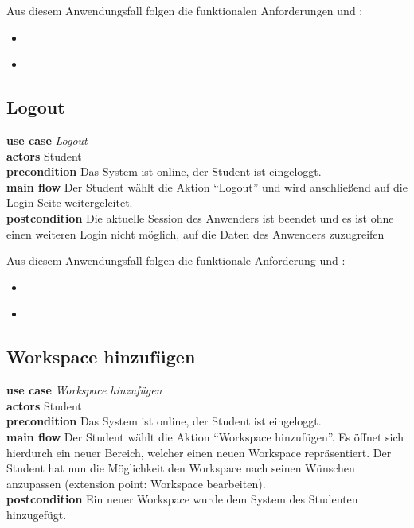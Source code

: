 Aus diesem Anwendungsfall folgen die funktionalen Anforderungen  und :
\begin{itemize}
 \item \requirement{\requirementLogin}\label{requirementLogin}
 \item \requirement{\requirementZugriffAufEigeneWidgets}\label{requirementZugriffAufEigeneWidgets}
\end{itemize}

\subsection{Logout}
\textbf{use case} \emph{Logout}\\
\textbf{actors} Student\\
\textbf{precondition} Das System ist online, der Student ist eingeloggt.\\
\textbf{main flow} Der Student wählt die Aktion "`Logout"' und wird anschließend auf die Login-Seite weitergeleitet.\\
\textbf{postcondition} Die aktuelle Session des Anwenders ist beendet und es ist ohne einen weiteren Login nicht möglich, auf die Daten des Anwenders zuzugreifen 
 
Aus diesem Anwendungsfall folgen die funktionale Anforderung  und :
\begin{itemize}
 \item \requirement{\requirementLogout}\label{requirementLogout}
 \item \requirement{\requirementKeinZugriffNachLogout}\label{requirementKeinZugriffNachLogout}
\end{itemize}

\subsection{Workspace hinzufügen}
\textbf{use case} \emph{Workspace hinzufügen}\\
\textbf{actors} Student\\
\textbf{precondition} Das System ist online, der Student ist eingeloggt.\\
\textbf{main flow} Der Student wählt die Aktion "`Workspace hinzufügen"'. Es öffnet sich hierdurch ein neuer Bereich, welcher einen neuen Workspace repräsentiert. Der Student hat nun die Möglichkeit den Workspace nach seinen Wünschen anzupassen (extension point: Workspace bearbeiten).\\
\textbf{postcondition} Ein neuer Workspace wurde dem System des Studenten hinzugefügt.
 

